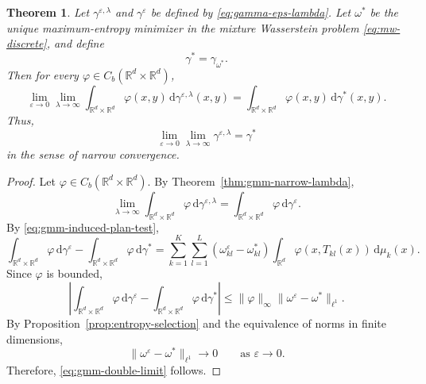 \documentclass[a4paper,11pt]{article}
\numberwithin{equation}{section}
\newtheorem{thm}{Theorem}[section]
\newcommand{\eps}{\varepsilon}
\newcommand{\RR}{\mathbb{R}}
\newcommand{\dd}{\,\mathrm{d}}
\begin{document}
\begin{thm}\label{thm:gmm-double-limit}
Let $\gamma^{\eps,\lambda}$ and $\gamma^\eps$ be defined by \eqref{eq:gamma-eps-lambda}. Let $\omega^*$ be the unique maximum-entropy minimizer in the mixture Wasserstein problem \eqref{eq:mw-discrete}, and define
\begin{equation*}
  \gamma^*=\gamma_{\omega^*}.
\end{equation*}
Then for every $\varphi\in C_b(\RR^d\times\RR^d)$,
\begin{equation}\label{eq:gmm-double-limit}
\lim_{\eps\to0}\lim_{\lambda\to\infty}\int_{\RR^d\times\RR^d}\varphi(x,y)\dd\gamma^{\eps,\lambda}(x,y)=\int_{\RR^d\times\RR^d}\varphi(x,y)\dd\gamma^*(x,y).
\end{equation}
Thus,
\begin{equation*}
\lim_{\eps\to0}\lim_{\lambda\to\infty}\gamma^{\eps,\lambda}=\gamma^*
\end{equation*}
in the sense of narrow convergence.
\end{thm}

\begin{proof}
Let $\varphi\in C_b(\RR^d\times\RR^d)$. By Theorem~\ref{thm:gmm-narrow-lambda},
\begin{equation*}
\lim_{\lambda\to\infty}\int_{\RR^d\times\RR^d}\varphi\dd\gamma^{\eps,\lambda}=\int_{\RR^d\times\RR^d}\varphi\dd\gamma^\eps.
\end{equation*}
By \eqref{eq:gmm-induced-plan-test},
\begin{equation*}
  \int_{\RR^d\times\RR^d}\varphi\dd\gamma^\eps-\int_{\RR^d\times\RR^d}\varphi\dd\gamma^*=\sum_{k=1}^{K}\sum_{l=1}^{L}\left(\omega^\eps_{kl}-\omega^*_{kl}\right)\int_{\RR^d}\varphi(x,T_{kl}(x))\dd\mu_k(x).
\end{equation*}
Since $\varphi$ is bounded,
\begin{equation*}
  \left| \int_{\RR^d\times\RR^d}\varphi\dd\gamma^\eps - \int_{\RR^d\times\RR^d}\varphi\dd\gamma^*
  \right| \leq \|\varphi\|_{\infty} \|\omega^\eps-\omega^*\|_{\ell^1}.
\end{equation*}
By Proposition~\ref{prop:entropy-selection} and the equivalence of norms in finite dimensions,
\begin{equation*}
  \|\omega^\eps-\omega^*\|_{\ell^1}\to0
  \qquad\text{as }\eps\to0.
\end{equation*}
Therefore, \eqref{eq:gmm-double-limit} follows.
\end{proof}
\end{document}
